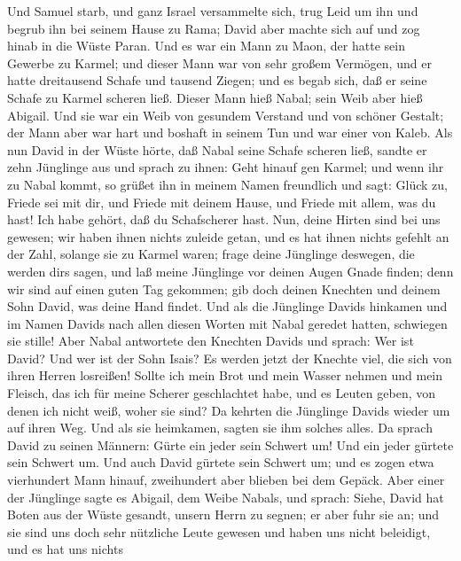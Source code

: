  Und Samuel starb, und ganz Israel versammelte sich, trug
Leid um ihn und begrub ihn bei seinem Hause zu Rama; David aber machte
sich auf und zog hinab in die Wüste Paran.  Und es war ein
Mann zu Maon, der hatte sein Gewerbe zu Karmel; und dieser Mann war von
sehr großem Vermögen, und er hatte dreitausend Schafe und tausend
Ziegen; und es begab sich, daß er seine Schafe zu Karmel scheren ließ.
 Dieser Mann hieß Nabal; sein Weib aber hieß Abigail. Und
sie war ein Weib von gesundem Verstand und von schöner Gestalt; der Mann
aber war hart und boshaft in seinem Tun und war einer von Kaleb.
 Als nun David in der Wüste hörte, daß Nabal seine Schafe
scheren ließ,  sandte er zehn Jünglinge aus und sprach zu
ihnen: Geht hinauf gen Karmel; und wenn ihr zu Nabal kommt, so grüßet
ihn in meinem Namen freundlich  und sagt: Glück zu, Friede
sei mit dir, und Friede mit deinem Hause, und Friede mit allem, was du
hast!  Ich habe gehört, daß du Schafscherer hast. Nun,
deine Hirten sind bei uns gewesen; wir haben ihnen nichts zuleide getan,
und es hat ihnen nichts gefehlt an der Zahl, solange sie zu Karmel
waren;  frage deine Jünglinge deswegen, die werden
dir\textquotesingle s sagen, und laß meine Jünglinge vor deinen Augen
Gnade finden; denn wir sind auf einen guten Tag gekommen; gib doch
deinen Knechten und deinem Sohn David, was deine Hand findet.
 Und als die Jünglinge Davids hinkamen und im Namen Davids
nach allen diesen Worten mit Nabal geredet hatten, schwiegen sie stille!
 Aber Nabal antwortete den Knechten Davids und sprach:
Wer ist David? Und wer ist der Sohn Isais? Es werden jetzt der Knechte
viel, die sich von ihren Herren losreißen!  Sollte ich
mein Brot und mein Wasser nehmen und mein Fleisch, das ich für meine
Scherer geschlachtet habe, und es Leuten geben, von denen ich nicht
weiß, woher sie sind?  Da kehrten die Jünglinge Davids
wieder um auf ihren Weg. Und als sie heimkamen, sagten sie ihm solches
alles.  Da sprach David zu seinen Männern: Gürte ein
jeder sein Schwert um! Und ein jeder gürtete sein Schwert um. Und auch
David gürtete sein Schwert um; und es zogen etwa vierhundert Mann
hinauf, zweihundert aber blieben bei dem Gepäck.  Aber
einer der Jünglinge sagte es Abigail, dem Weibe Nabals, und sprach:
Siehe, David hat Boten aus der Wüste gesandt, unsern Herrn zu segnen; er
aber fuhr sie an;  und sie sind uns doch sehr nützliche
Leute gewesen und haben uns nicht beleidigt, und es hat uns nichts
